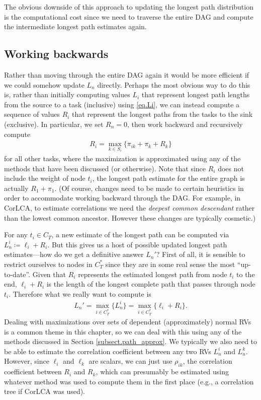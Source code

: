 \documentclass[12pt]{article}
\begin{document}
The obvious downside of this approach to updating the longest path distribution is the computational cost since we need to traverse the entire DAG and compute the intermediate longest path estimates again.  


\subsection{Working backwards}
\label{subsect.updating_backwards}

Rather than moving through the entire DAG again it would be more efficient if we could somehow update $L_n$ directly. Perhaps the most obvious way to do this is, rather than initially computing values $L_i$ that represent longest path lengths from the source to a task (inclusive) using \eqref{eq.Li}, we can instead compute a sequence of values $R_i$ that represent the longest paths from the tasks to the sink (exclusive). In particular, we set $R_n = 0$, then work backward and recursively compute  
\begin{align*}
  R_i = \max_{k \in S_i} \{ \pi_{ik} + \pi_k + R_k  \}
\end{align*}
for all other tasks, where the maximization is approximated using any of the methods that have been discussed (or otherwise). Note that since $R_i$ does not include the weight of node $t_i$, the longest path estimate for the entire graph is actually $R_1 + \pi_1$. (Of course, changes need to be made to certain heuristics in order to accommodate working backward through the DAG. For example, in CorLCA, to estimate correlations we need the {\em deepest common descendant} rather than the lowest common ancestor. However these changes are typically cosmetic.)

For any $t_i \in C_T$, a new estimate of the longest path can be computed via $L_n^i \coloneqq \ell_i + R_i$. But this gives us a host of possible updated longest path estimates---how do we get a definitive answer $L_n'$? First of all, it is sensible to restrict ourselves to nodes in $C_T^*$ since they are in some real sense the most ``up-to-date''. Given that $R_i$ represents the estimated longest path from node $t_i$ to the end, $\ell_i + R_i$ is the length of the longest complete path that passes through node $t_i$. Therefore what we really want to compute is       
\begin{align*}
  L_n' = \max_{i \in C_T^*} \{ L_n^i  \} = \max_{i \in C_T^*} \{ \ell_i + R_i  \}.
\end{align*}
Dealing with maximizations over sets of dependent (approximately) normal RVs is a common theme in this chapter, so we can deal with this using any of the methods discussed in Section \ref{subsect.path_approx}. We typically we also need to be able to estimate the correlation coefficient between any two RVs $L_n^i$ and $L_n^k$. However, since $\ell_i$ and $\ell_k$ are scalars, we can just use $\rho_{ik}$, the correlation coefficient between $R_i$ and $R_k$, which can presumably be estimated using whatever method was used to compute them in the first place (e.g., a correlation tree if CorLCA was used).   
\end{document}
